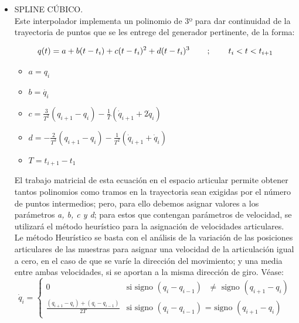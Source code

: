 	\begin{itemize}
		\item SPLINE CÚBICO.\\
		Este interpolador implementa un polinomio de 3º para dar continuidad de la trayectoria de puntos que se les entrege del
		generador pertinente, de la forma:
		\begin{center}
			\begin{equation}
				q(t)= a + b (t-t_{i}) +c (t-t_{i})^{2} + d (t-t_{i})^{3} \hspace{0.75cm};\hspace{0.75cm} t_{i}<t<t_{i+1}
			\end{equation}
			\begin{itemize}
				\item $a = q_{i} $
				\item $b = \dot{q_{i}} $
				\item $c= \frac{3}{T^{2}}(q_{i+1}-q_{i})-\frac{1}{T}(\dot{q}_{i+1}+2\dot{q}_{i})$
				\item $d= -\frac{2}{T^{3}}(q_{i+1}-q_{i})-\frac{1}{T^{2}}(\dot{q}_{i+1}+\dot{q}_{i})$
				\item $T=t_{i+1}-t_{1}$
			\end{itemize}
		\end{center}
		El trabajo matricial de esta ecuación en el espacio articular permite obtener tantos 
		polinomios como tramos en la trayectoria sean exigidas por el número de puntos intermedios; pero, para ello debemos asignar valores a 
		los parámetros \textit{a, b, c y d}; para estos que contengan parámetros de velocidad, se utilizará 
		el método heurístico para la asignación de velocidades articulares.\\

		Le método Heurístico se basta con el análisis de la variación de las posiciones 
		articulares de las muestras para asignar una velocidad de la articulación igual a cero, en el caso de que se varíe la 
		dirección del movimiento; y una media entre ambas velocidades, si se aportan a la misma dirección de giro. Véase: \\

		\[
		\dot{q}_{i}= \left\{ \begin{array}{ll} 
			0 & \textrm{si signo $(q_{i}-q_{i-1})$ $\neq$ signo $(q_{i+1}- q_{i})$} \\
			\frac{(q_{i+1}- q_{i})+(q_{i}-q_{i-1})}{2T} & \textrm{si signo $(q_{i}-q_{i-1})$ = signo $(q_{i+1}- q_{i})$}
																														
		\end{array}\right.				
		\]

		
	\end{itemize}
	

